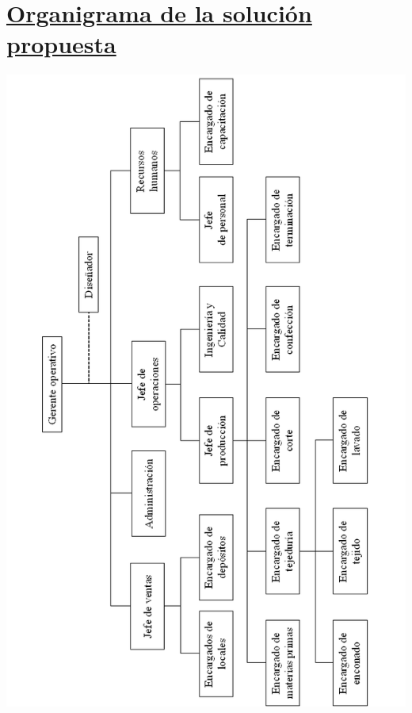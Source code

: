 \documentclass[a4paper,12pt,titlepage]{article}
\begin{document}
\section{\underline{Organigrama de la soluci\'on propuesta}}
	\begin{center}
	\includegraphics[width=430pt]{./DollyOrnigramaSolucion.png}
	\end{center}
\end{document}
